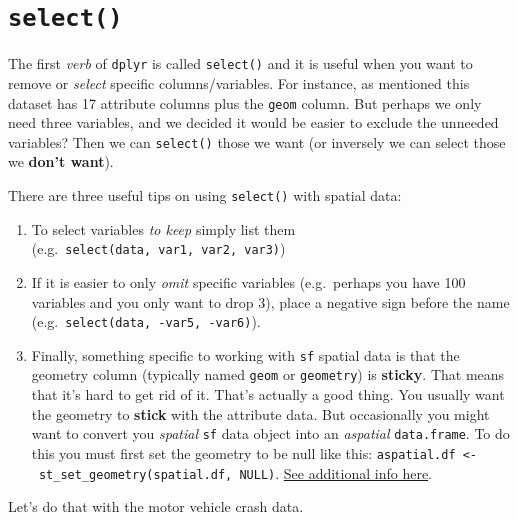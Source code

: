 \documentclass[
]{book}
\providecommand{\tightlist}{%
  \setlength{\itemsep}{0pt}\setlength{\parskip}{0pt}}
\begin{document}
\hypertarget{select}{%
\section{\texorpdfstring{\texttt{select()}}{select()}}\label{select}}

The first \emph{verb} of \texttt{dplyr} is called \texttt{select()} and it is useful when you want to remove or \emph{select} specific columns/variables. For instance, as mentioned this dataset has 17 attribute columns plus the \texttt{geom} column. But perhaps we only need three variables, and we decided it would be easier to exclude the unneeded variables? Then we can \texttt{select()} those we want (or inversely we can select those we \textbf{don't want}).

There are three useful tips on using \texttt{select()} with spatial data:

\begin{enumerate}
\def\labelenumi{\arabic{enumi}.}
\tightlist
\item
  To select variables \emph{to keep} simply list them (e.g.~\texttt{select(data,\ var1,\ var2,\ var3)})
\item
  If it is easier to only \emph{omit} specific variables (e.g.~perhaps you have 100 variables and you only want to drop 3), place a negative sign before the name (e.g.~\texttt{select(data,\ -var5,\ -var6)}).
\item
  Finally, something specific to working with \texttt{sf} spatial data is that the geometry column (typically named \texttt{geom} or \texttt{geometry}) is \textbf{sticky}. That means that it's hard to get rid of it. That's actually a good thing. You usually want the geometry to \textbf{stick} with the attribute data. But occasionally you might want to convert you \emph{spatial} \texttt{sf} data object into an \emph{aspatial} \texttt{data.frame}. To do this you must first set the geometry to be null like this: \texttt{aspatial.df\ \textless{}-\ st\_set\_geometry(spatial.df,\ NULL)}. \protect\hyperlink{sf-overview}{See additional info here}.
\end{enumerate}

Let's do that with the motor vehicle crash data.
\end{document}
